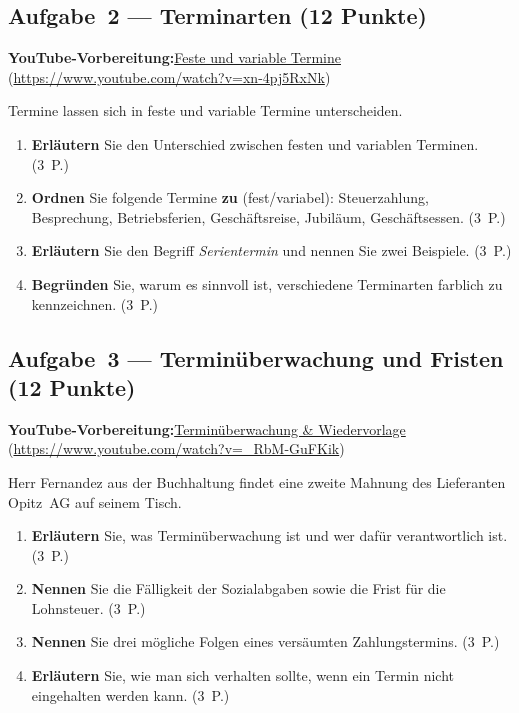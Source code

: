 \documentclass[11pt, a4paper]{article}
\begin{document}
\subsection*{Aufgabe~2 --- Terminarten (12 Punkte)}

\noindent\textbf{\color{bfwAccent}YouTube-Vorbereitung:}\enspace \href{https://www.youtube.com/watch?v=xn-4pj5RxNk}{Feste und variable Termine} (\url{https://www.youtube.com/watch?v=xn-4pj5RxNk})

\medskip
Termine lassen sich in feste und variable Termine unterscheiden.

\begin{enumerate}[label=(\alph*)]
  \item \textbf{Erläutern} Sie den Unterschied zwischen festen und variablen Terminen. \hfill (3~P.)
  \item \textbf{Ordnen} Sie folgende Termine \textbf{zu} (fest/variabel): Steuerzahlung, Besprechung, Betriebsferien, Geschäftsreise, Jubiläum, Geschäftsessen. \hfill (3~P.)
  \item \textbf{Erläutern} Sie den Begriff \emph{Serientermin} und nennen Sie zwei Beispiele. \hfill (3~P.)
  \item \textbf{Begründen} Sie, warum es sinnvoll ist, verschiedene Terminarten farblich zu kennzeichnen. \hfill (3~P.)
\end{enumerate}

\subsection*{Aufgabe~3 --- Terminüberwachung und Fristen (12 Punkte)}

\noindent\textbf{\color{bfwAccent}YouTube-Vorbereitung:}\enspace \href{https://www.youtube.com/watch?v=_RbM-GuFKik}{Terminüberwachung \& Wiedervorlage} (\url{https://www.youtube.com/watch?v=_RbM-GuFKik})

\medskip
Herr Fernandez aus der Buchhaltung findet eine zweite Mahnung des Lieferanten Opitz~AG
auf seinem Tisch.

\begin{enumerate}[label=(\alph*)]
  \item \textbf{Erläutern} Sie, was Terminüberwachung ist und wer dafür verantwortlich ist. \hfill (3~P.)
  \item \textbf{Nennen} Sie die Fälligkeit der Sozialabgaben sowie die Frist für die Lohnsteuer. \hfill (3~P.)
  \item \textbf{Nennen} Sie drei mögliche Folgen eines versäumten Zahlungstermins. \hfill (3~P.)
  \item \textbf{Erläutern} Sie, wie man sich verhalten sollte, wenn ein Termin nicht eingehalten werden kann. \hfill (3~P.)
\end{enumerate}
\end{document}

